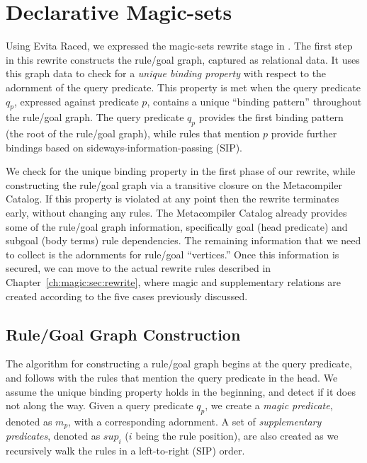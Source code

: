 \section{Declarative Magic-sets}
\label{ch:magic:sec:rules}

Using Evita Raced, we expressed the magic-sets rewrite stage in \OVERLOG.  The
first step in this rewrite constructs the rule/goal graph, captured as
relational data.  It uses this graph data to check for a {\em unique binding
property} with respect to the adornment of the query predicate.  This property
is met when the query predicate $q_p$, expressed against predicate $p$,
contains a unique ``binding pattern'' throughout the rule/goal graph.  The
query predicate $q_p$ provides the first binding pattern (the root of the
rule/goal graph), while rules that mention $p$ provide further bindings based
on sideways-information-passing (SIP).

We check for the unique binding property in the first phase of our rewrite,
while constructing the rule/goal graph via a transitive closure on the
Metacompiler Catalog.  If this property is violated at any point then the
rewrite terminates early, without changing any rules.  The Metacompiler Catalog
already provides some of the rule/goal graph information, specifically goal
(head predicate) and subgoal (body terms) rule dependencies.  The remaining
information that we need to collect is the adornments for rule/goal
``vertices.''  Once this information is secured, we can move to the actual
rewrite rules described in Chapter~\ref{ch:magic:sec:rewrite}, where magic and
supplementary relations are created according to the five cases previously
discussed.

\subsection{Rule/Goal Graph Construction}
\label{ch:magic:sec:rgconstruct}

The algorithm for constructing a rule/goal graph begins at the query predicate,
and follows with the rules that mention the query predicate in the head.  We
assume the unique binding property holds in the beginning, and detect if it
does not along the way.  Given a query predicate $q_p$, we create a {\em magic
predicate}, denoted as $m_p$, with a corresponding adornment.  A set of {\em
supplementary predicates}, denoted as $sup_i$ ($i$ being the rule position),
are also created as we recursively walk the rules in a left-to-right (SIP)
order.


